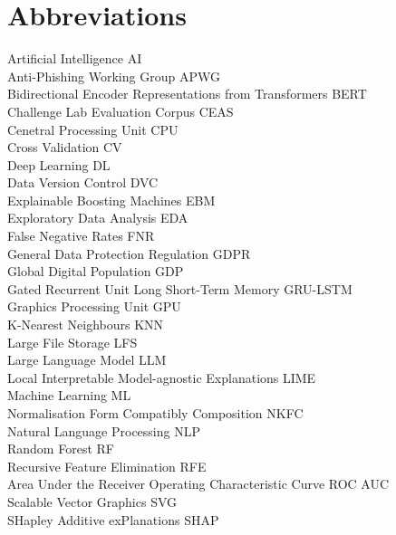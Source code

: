 
\section*{Abbreviations}

\large
Artificial Intelligence \hfill AI\\
Anti-Phishing Working Group \hfill APWG\\
Bidirectional Encoder Representations from Transformers \hfill BERT\\
Challenge Lab Evaluation Corpus \hfill CEAS\\
Cenetral Processing Unit \hfill CPU\\
Cross Validation \hfill CV\\
Deep Learning \hfill DL\\
Data Version Control \hfill DVC\\
Explainable Boosting Machines \hfill EBM\\
Exploratory Data Analysis \hfill EDA\\
False Negative Rates \hfill FNR\\
General Data Protection Regulation \hfill GDPR\\
Global Digital Population \hfill GDP\\
Gated Recurrent Unit Long Short-Term Memory \hfill GRU-LSTM\\
Graphics Processing Unit \hfill GPU\\
K-Nearest Neighbours \hfill KNN\\
Large File Storage \hfill LFS\\
Large Language Model \hfill LLM\\
Local Interpretable Model-agnostic Explanations \hfill LIME\\
Machine Learning \hfill ML\\
Normalisation Form Compatibly Composition \hfill NKFC\\
Natural Language Processing \hfill NLP\\
Random Forest \hfill RF\\
Recursive Feature Elimination \hfill RFE\\
Area Under the Receiver Operating Characteristic Curve \hfill ROC AUC\\
Scalable Vector Graphics \hfill SVG\\
SHapley Additive exPlanations \hfill SHAP\\
